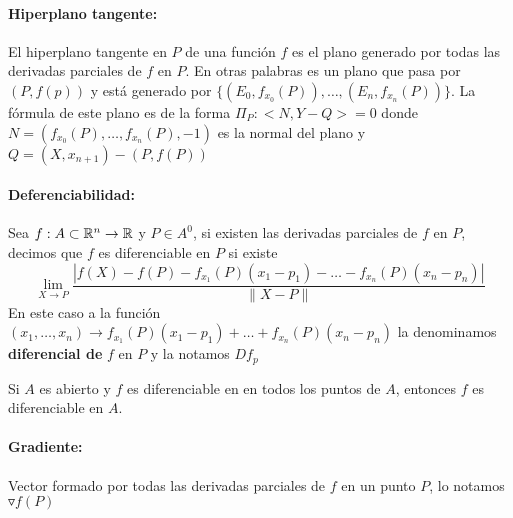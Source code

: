 \paragraph{Hiperplano tangente: } El hiperplano tangente en $P$ de una función $f$ es el plano generado por todas las derivadas parciales de $f$ en $P$. En otras palabras es un plano que pasa por $(P, f(p))$ y está generado por $\{(E_0, f_{x_0}(P)),\dots,(E_n, f_{x_n}(P))\}$. La fórmula de este plano es de la forma $\Pi_P: <N, Y-Q> = 0$ donde $N = (f_{x_0}(P),\dots,f_{x_n}(P),-1)$ es la normal del plano y $Q = (X, x_{n+1}) - (P,f(P))$

\paragraph{Deferenciabilidad:} Sea $f:A\subset\mathbb{R}^n\to\mathbb{R}$ y $P\in A^0$, si existen las derivadas parciales de $f$ en $P$, decimos que $f$ es diferenciable en $P$ si existe
\begin{equation*}
    \lim_{X\to P} \frac{|f(X)-f(P) - f_{x_1}(P)(x_1-p_1) - \dots - f_{x_n}(P)(x_n-p_n)|}{
    \|X - P\|}
\end{equation*}
En este caso a la función $(x_1,\dots,x_n)\to f_{x_1}(P)(x_1-p_1) +\dots+ f_{x_n}(P)(x_n-p_n) $ la denominamos \textbf{diferencial de} $f$ en $P$ y la notamos $Df_p$

Si $A$ es abierto y $f$ es diferenciable en en todos los puntos de $A$, entonces $f$ es diferenciable en $A$.

\paragraph{Gradiente:} Vector formado por todas las derivadas parciales de $f$ en un punto $P$, lo notamos $\triangledown f(P)$
